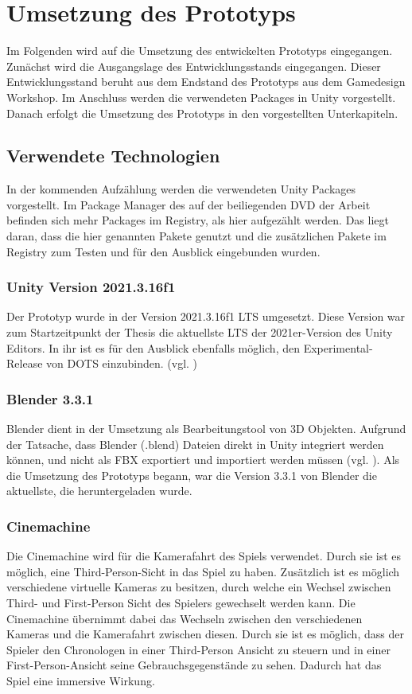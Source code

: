 \chapter{Umsetzung des Prototyps}\label{sec:dev}
Im Folgenden wird auf die Umsetzung des entwickelten Prototyps eingegangen. Zunächst wird die Ausgangslage des Entwicklungsstands eingegangen. Dieser Entwicklungsstand beruht aus dem Endstand des Prototyps aus dem Gamedesign Workshop. Im Anschluss werden die verwendeten Packages in Unity vorgestellt. Danach erfolgt die Umsetzung des Prototyps in den vorgestellten Unterkapiteln.

\section{Verwendete Technologien}
In der kommenden Aufzählung werden die verwendeten Unity Packages vorgestellt. Im Package Manager des auf der beiliegenden \ac{DVD} der Arbeit befinden sich mehr Packages im Registry, als hier aufgezählt werden. Das liegt daran, dass die hier genannten Pakete genutzt und die zusätzlichen Pakete im Registry zum Testen und für den Ausblick eingebunden wurden.

\subsection{Unity Version 2021.3.16f1}
Der Prototyp wurde in der Version 2021.3.16f1 \ac{LTS} umgesetzt. Diese Version war zum Startzeitpunkt der Thesis die aktuellste \ac{LTS} der 2021er-Version des Unity Editors. In ihr ist es für den Ausblick ebenfalls möglich, den Experimental-Release von \ac{DOTS} einzubinden. 
(vgl. \cite{noauthor_official_nodate})

\subsection{Blender 3.3.1}
Blender dient in der Umsetzung als Bearbeitungstool von \ac{3D} Objekten. Aufgrund der Tatsache, dass Blender (.blend) Dateien direkt in Unity integriert werden können, und nicht als \ac{FBX} exportiert und importiert werden müssen (vgl. \cite{technologies_unity_nodate}). Als die Umsetzung des Prototyps begann, war die Version 3.3.1 von Blender die aktuellste, die heruntergeladen wurde.

\subsection{Cinemachine}
Die Cinemachine wird für die Kamerafahrt des Spiels verwendet. Durch sie ist es möglich, eine Third-Person-Sicht in das Spiel zu haben. Zusätzlich ist es möglich verschiedene virtuelle Kameras zu besitzen, durch welche ein Wechsel zwischen Third- und First-Person Sicht des Spielers gewechselt werden kann. Die Cinemachine übernimmt dabei das Wechseln zwischen den verschiedenen Kameras und die Kamerafahrt zwischen diesen. Durch sie ist es möglich, dass der Spieler den Chronologen in einer Third-Person Ansicht zu steuern und in einer First-Person-Ansicht seine Gebrauchsgegenstände zu sehen. Dadurch hat das Spiel eine immersive Wirkung.

